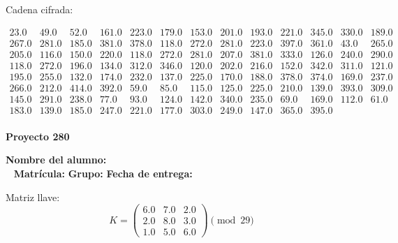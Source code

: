 \documentclass[12pt]{article}
\begin{document}
Cadena cifrada:
\begin{center}
$\begin{array}{lllllllllllll}
23.0 & 49.0 & 52.0 & 161.0 & 223.0 & 179.0 & 153.0 & 201.0 & 193.0 & 221.0 & 345.0 & 330.0 & 189.0\\
267.0 & 281.0 & 185.0 & 381.0 & 378.0 & 118.0 & 272.0 & 281.0 & 223.0 & 397.0 & 361.0 & 43.0 & 265.0\\
205.0 & 116.0 & 150.0 & 220.0 & 118.0 & 272.0 & 281.0 & 207.0 & 381.0 & 333.0 & 126.0 & 240.0 & 290.0\\
118.0 & 272.0 & 196.0 & 134.0 & 312.0 & 346.0 & 120.0 & 202.0 & 216.0 & 152.0 & 342.0 & 311.0 & 121.0\\
195.0 & 255.0 & 132.0 & 174.0 & 232.0 & 137.0 & 225.0 & 170.0 & 188.0 & 378.0 & 374.0 & 169.0 & 237.0\\
266.0 & 212.0 & 414.0 & 392.0 & 59.0 & 85.0 & 115.0 & 125.0 & 225.0 & 210.0 & 139.0 & 393.0 & 309.0\\
145.0 & 291.0 & 238.0 & 77.0 & 93.0 & 124.0 & 142.0 & 340.0 & 235.0 & 69.0 & 169.0 & 112.0 & 61.0\\
183.0 & 139.0 & 185.0 & 247.0 & 221.0 & 177.0 & 303.0 & 249.0 & 147.0 & 365.0 & 395.0\\
\end{array}$
\end{center}

\newpage


\textbf{Proyecto 280}

\textbf{Nombre del alumno:} \underline{\hspace{13cm}}\\\
\vspace{1cm}
\textbf{Matrícula:} \underline{\hspace{4cm}} \hspace{1cm}
\textbf{Grupo:} \underline{\hspace{2cm}}
\textbf{Fecha de entrega:} \underline{\hspace{2cm}}

\medskip

Matriz llave:
\[
K = \begin{pmatrix}
6.0 & 7.0 & 2.0\\
2.0 & 8.0 & 3.0\\
1.0 & 5.0 & 6.0
\end{pmatrix} \pmod{29}
\]
\end{document}
